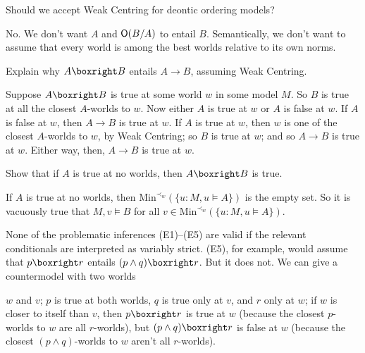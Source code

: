 \begin{exercise}
  Should we accept Weak Centring for deontic ordering models?
\end{exercise}
\begin{solution}
  No. We don't want $A$ and $\operatorname{\mathsf{O}}(B/A)$ to entail $B$. Semantically, we don't
  want to assume that every world is among the best worlds relative to its own
  norms.
\end{solution}

\begin{exercise}
  Explain why $A \boxright B$ entails $A \to B$, assuming Weak Centring.
\end{exercise}
\begin{solution}
  Suppose $A \boxright B$ is true at some world $w$ in some model $M$. So $B$ is
  true at all the closest $A$-worlds to $w$. Now either $A$ is true at $w$ or
  $A$ is false at $w$. If $A$ is false at $w$, then $A\to B$ is true at $w$. If
  $A$ is true at $w$, then $w$ is one of the closest $A$-worlds to $w$, by Weak
  Centring; so $B$ is true at $w$; and so $A\to B$ is true at $w$. Either way,
  then, $A\to B$ is true at $w$.
\end{solution}

\begin{exercise}
  Show that if $A$ is true at no worlds, then $A \boxright B$ is true.
\end{exercise}
\begin{solution}
  If $A$ is true at no worlds, then $\mathrm{Min}^{\prec_w}(\{u: M,u\models A\})$
  is the empty set. So it is vacuously true that $M,v \models B$ for all
  $v \in \mathrm{Min}^{\prec_w}(\{ u: M,u \models A \})$.
\end{solution}

None of the problematic inferences (E1)--(E5) are valid if the relevant
conditionals are interpreted as variably strict. (E5), for example, would assume
that $p \boxright r $ entails $(p \land q) \boxright r$. But it does not. We can
give a countermodel with two worlds
\begin{figure}
  \vspace{-5mm}
  \quad
  \vspace{-10mm}
\end{figure}
$w$ and $v$; $p$ is true at both worlds, $q$ is true only at $v$, and $r$ only
at $w$; if $w$ is closer to itself than $v$, then $p \boxright r$ is true at $w$
(because the closest $p$-worlds to $w$ are all $r$-worlds), but
$(p \land q) \boxright r$ is false at $w$ (because the closest
$(p\land q)$-worlds to $w$ aren't all $r$-worlds).

